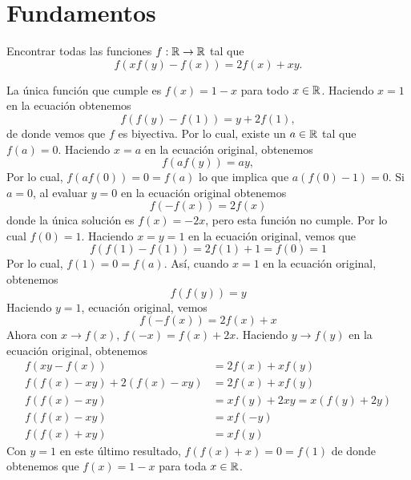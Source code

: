 \section{Fundamentos}

\begin{definition}[Función]
\end{definition}

\begin{example}
    Encontrar todas las funciones $f: \mathbb{R} \to \mathbb{R}$ tal que
    \[
        f(xf(y) - f(x)) = 2f(x) + xy.
    \]
\end{example}
\begin{solution*}
    La única función que cumple es $f(x) = 1 - x$ para todo $x \in \mathbb{R}$.
    Haciendo $x = 1$ en la ecuación obtenemos
    \[
        f(f(y) - f(1)) = y + 2f(1),
    \]
    de donde vemos que $f$ es biyectiva.
    Por lo cual, existe un $a \in \mathbb{R}$ tal que $f(a) = 0$.
    Haciendo $x = a$ en la ecuación original, obtenemos
    \[
        f(af(y)) = ay,
    \]
    Por lo cual, $f(af(0)) = 0 = f(a)$ lo que implica que $a (f(0) - 1) = 0$.
    Si $a = 0$, al evaluar $y = 0$ en la ecuación original obtenemos
    \[
        f(-f(x)) = 2f(x)
    \]
    donde la única solución es $f(x) = -2x$, pero esta función no cumple.
    Por lo cual $f(0) = 1$.
    Haciendo $x = y = 1$ en la ecuación original, vemos que
    \[
        f(f(1) - f(1)) = 2f(1) + 1  = f(0)  = 1
    \]
    Por lo cual, $f(1) = 0 = f(a)$.
    Así, cuando $x = 1$ en la ecuación original, obtenemos
    \[
        f(f(y)) = y
    \]
    Haciendo $y = 1$, ecuación original, vemos
    \[
        f(-f(x)) = 2f(x) + x
    \]
    Ahora con $x \to f(x)$, $f(-x) = f(x) + 2x$.
    Haciendo $y \to f(y)$ en la ecuación original, obtenemos
    \begin{align*}
        f(xy - f(x)) &= 2f(x) + xf(y)\\
        f(f(x) - xy) + 2(f(x) - xy) &= 2f(x) + xf(y)\\
        f(f(x) - xy) &= xf(y) + 2xy = x(f(y) + 2y)\\
        f(f(x) - xy) &= xf(-y)\\
        f(f(x) + xy) &= xf(y)
    \end{align*}
    Con $y = 1$ en este último resultado, $f(f(x) + x) = 0 = f(1)$ de donde obtenemos que $f(x) = 1 - x$ para toda $x \in \mathbb{R}$.
\end{solution*}